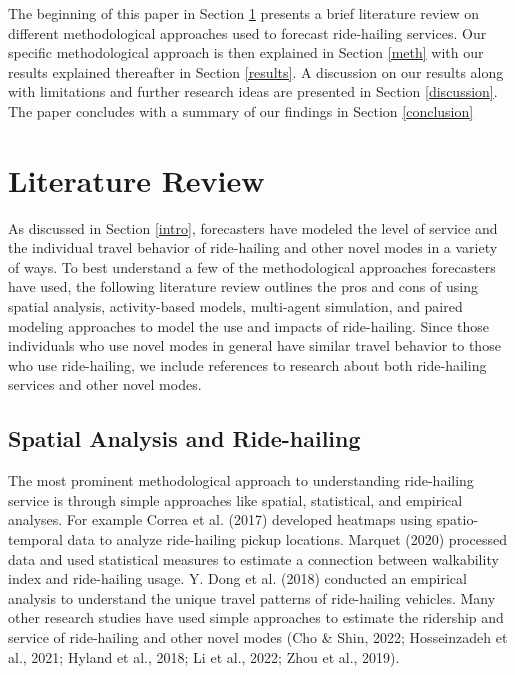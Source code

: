 \documentclass[fancy, masters]{byuthesis}
\begin{document}
The beginning of this paper in Section \ref{lit} presents a brief literature review on different methodological approaches used to forecast ride-hailing services. Our specific methodological approach is then explained in Section \ref{meth} with our results explained thereafter in Section \ref{results}. A discussion on our results along with limitations and further research ideas are presented in Section \ref{discussion}. The paper concludes with a summary of our findings in Section \ref{conclusion}

\hypertarget{lit}{%
\chapter{Literature Review}\label{lit}}

As discussed in Section \ref{intro}, forecasters have modeled the level of service and the individual travel behavior of ride-hailing and other novel modes in a variety of ways. To best understand a few of the methodological approaches forecasters have used, the following literature review outlines the pros and cons of using spatial analysis, activity-based models, multi-agent simulation, and paired modeling approaches to model the use and impacts of ride-hailing. Since those individuals who use novel modes in general have similar travel behavior to those who use ride-hailing, we include references to research about both ride-hailing services and other novel modes.

\hypertarget{lit-simp}{%
\section{Spatial Analysis and Ride-hailing}\label{lit-simp}}

The most prominent methodological approach to understanding ride-hailing service is through simple approaches like spatial, statistical, and empirical analyses. For example Correa et al. (2017) developed heatmaps using spatio-temporal data to analyze ride-hailing pickup locations. Marquet (2020) processed data and used statistical measures to estimate a connection between walkability index and ride-hailing usage. Y. Dong et al. (2018) conducted an empirical analysis to understand the unique travel patterns of ride-hailing vehicles. Many other research studies have used simple approaches to estimate the ridership and service of ride-hailing and other novel modes (Cho \& Shin, 2022; Hosseinzadeh et al., 2021; Hyland et al., 2018; Li et al., 2022; Zhou et al., 2019).
\end{document}
